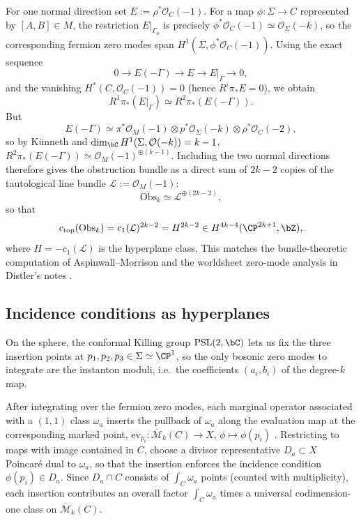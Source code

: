 \documentclass[12pt]{article}
\begin{document}
For one normal direction set $E:=\rho^*\mathcal{O}_C(-1)$. For a map
$\phi:\Sigma\to C$ represented by $[A,B]\in M$, the restriction
$E|_{\Gamma_\phi}$ is precisely $\phi^*\mathcal{O}_C(-1)\simeq\mathcal{O}_\Sigma(-k)$,
so the corresponding fermion zero modes span $H^1(\Sigma,\phi^*\mathcal{O}_C(-1))$.
Using the exact sequence
\begin{equation*}
  0\to E(-\Gamma)\to E\to E|_\Gamma\to 0,
\end{equation*}
and the vanishing $H^*(C,\mathcal{O}_C(-1))=0$ (hence $R^i\pi_*E=0$), we obtain
\begin{equation*}
  R^1\pi_*(E|_\Gamma)\simeq R^2\pi_*(E(-\Gamma)).
\end{equation*}
But
\begin{equation*}
  E(-\Gamma)\simeq \pi^*\mathcal{O}_M(-1)\otimes p^*\mathcal{O}_\Sigma(-k)\otimes \rho^*\mathcal{O}_C(-2),
\end{equation*}
so by K\"unneth and $\dim_\bC H^1(\Sigma,\mathcal{O}(-k))=k-1$,
$R^2\pi_*(E(-\Gamma))\simeq \mathcal{O}_M(-1)^{\oplus(k-1)}$. Including the two
normal directions therefore gives the obstruction bundle as a direct sum of
$2k-2$ copies of the tautological line bundle $\mathcal{L}:=\mathcal{O}_M(-1)$:
\begin{equation}
  \mathrm{Obs}_k\simeq \mathcal{L}^{\oplus (2k-2)},
  \label{eq:obs-k}
\end{equation}
so that
\begin{equation}
  c_{\mathrm{top}}(\mathrm{Obs}_k)=c_1(\mathcal{L})^{2k-2}=H^{2k-2}\in H^{4k-4}(\CP^{2k+1},\bZ),
  \label{eq:ctop-obs-k}
\end{equation}
where $H=-c_1(\mathcal{L})$ is the hyperplane class. This matches the
bundle-theoretic computation of Aspinwall--Morrison and the worldsheet
zero-mode analysis in Distler's notes \cite{AspinwallMorrison:1991tft,Distler:1992n2}.

\subsection{Incidence conditions as hyperplanes}
On the sphere, the conformal Killing group $\mathrm{PSL}(2,\bC)$ lets us fix the
three insertion points at $p_1,p_2,p_3\in\Sigma\simeq\CP^1$, so the only bosonic
zero modes to integrate are the instanton moduli, i.e.\ the coefficients
$(a_i,b_i)$ of the degree-$k$ map.

After integrating over the fermion zero modes, each marginal operator
associated with a $(1,1)$ class $\omega_a$ inserts the pullback of $\omega_a$
along the evaluation map at the corresponding marked point,
$\mathrm{ev}_{p_i}:\overline{\mathcal{M}}_k(C)\to X$, $\phi\mapsto \phi(p_i)$
\cite{Distler:1992n2,AspinwallMorrison:1991tft}. Restricting to maps with image
contained in $C$, choose a divisor representative $D_a\subset X$ Poincar\'e dual
to $\omega_a$, so that the insertion enforces the incidence condition
$\phi(p_i)\in D_a$. Since $D_a\cap C$ consists of $\int_C\omega_a$ points (counted
with multiplicity), each insertion contributes an overall factor $\int_C\omega_a$
times a universal codimension-one class on $\overline{\mathcal{M}}_k(C)$.
\end{document}

